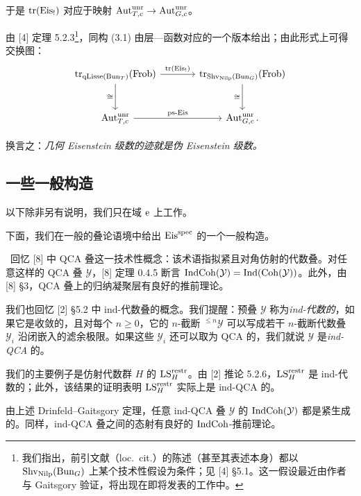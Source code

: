 于是 $\operatorname{tr}(\mathrm{Eis}_!)$ 对应于映射 $\operatorname{Aut}^{\mathrm{unr}}_{T,c} \to \operatorname{Aut}^{\mathrm{unr}}_{G,c}$。

由 [4] 定理 5.2.3\footnote{我们指出，前引文献（loc.\ cit.）的陈述（甚至其表述本身）都以 $\mathrm{Shv}_{\mathrm{Nilp}}(\mathrm{Bun}_G)$ 上某个技术性假设为条件；见 [4] §5.1。这一假设最近由作者与 Gaitsgory 验证，将出现在即将发表的工作中。}，同构 (3.1) 由层—函数对应的一个版本给出；由此形式上可得交换图：
\begin{equation}
  \begin{tikzcd}[column sep=large, row sep=large]
    \tr_{\qLisse(\Bun_T)}(\Frob) \arrow[r, "\tr(\Eis_!)"] \arrow[d, "\cong"']
      & \tr_{\Shv_{\Nilp}(\Bun_G)}(\Frob) \arrow[d, "\cong"'] \\
    \Aut^{\unr}_{T,c} \arrow[r, "\text{ps-Eis}"]
      & \Aut^{\unr}_{G,c}.
  \end{tikzcd}
\end{equation}

换言之：\emph{几何 Eisenstein 级数的迹就是伪 Eisenstein 级数。}

\subsection{一些一般构造}

以下除非另有说明，我们只在域 $\mathrm{e}$ 上工作。

下面，我们在一般的叠论语境中给出 $\mathrm{Eis}^{\mathrm{spec}}$ 的一个一般构造。

\ 回忆 [8] 中 QCA 叠这一技术性概念：该术语指拟紧且对角仿射的代数叠。对任意这样的 QCA 叠 $\mathcal{Y}$，[8] 定理 0.4.5 断言 $\mathrm{IndCoh}(\mathcal{Y}) = \mathrm{Ind}(\mathrm{Coh}(\mathcal{Y}))$。此外，由 [8] §3，QCA 叠上的归纳凝聚层有良好的推前理论。

我们也回忆 [2] §5.2 中 ind-代数叠的概念。我们提醒：预叠 $\mathcal{Y}$ 称为\emph{ind-代数的}，如果它是收敛的，且对每个 $n \ge 0$，它的 $n$-截断 ${}^{\le n}\mathcal{Y}$ 可以写成若干 $n$-截断代数叠 $\mathcal{Y}_i$ 沿闭嵌入的滤余极限。如果这些 $\mathcal{Y}_i$ 还可以取为 QCA 的，我们就说 $\mathcal{Y}$ 是\emph{ind-QCA} 的。

我们的主要例子是仿射代数群 $H$ 的 $\mathrm{LS}^{\mathrm{restr}}_H$。由 [2] 推论 5.2.6，$\mathrm{LS}^{\mathrm{restr}}_H$ 是 ind-代数的；此外，该结果的证明表明 $\mathrm{LS}^{\mathrm{restr}}_H$ 实际上是 ind-QCA 的。

由上述 Drinfeld--Gaitsgory 定理，任意 ind-QCA 叠 $\mathcal{Y}$ 的 $\mathrm{IndCoh}(\mathcal{Y})$ 都是紧生成的。同样，ind-QCA 叠之间的态射有良好的 $\mathrm{IndCoh}$-推前理论。

